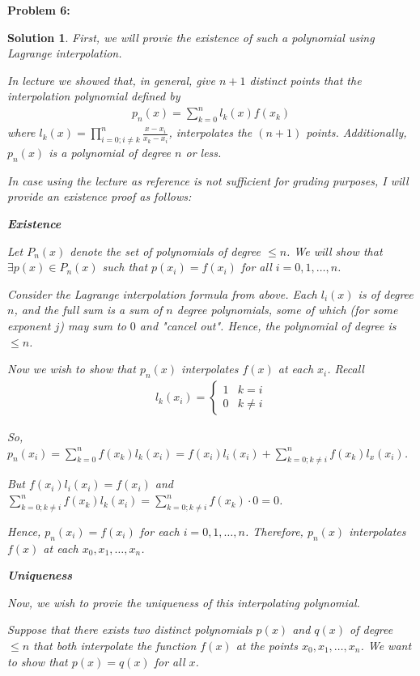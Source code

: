 \documentclass[12pt, letterpaper]{article}
\theoremstyle{nonumberplain}
\newtheorem{sol}{Solution}
\begin{document}
\hspace{18pt}\textbf{Problem 6:} \medskip
\begin{sol}
	First, we will provie the existence of such a polynomial using Lagrange interpolation.

	In lecture we showed that, in general, give $n+1$ distinct points that the interpolation polynomial defined by
	\begin{gather*}
		p_n(x) = \sum_{k=0}^n l_k(x) f(x_k)
	\end{gather*}
	where $l_k(x) = \prod_{i=0; i\neq k}^n \frac{x - x_i}{x_k - x_i}$, interpolates the $(n+1)$ points. Additionally, $p_n(x)$ is a polynomial of degree $n$ or less.

	In case using the lecture as reference is not sufficient for grading purposes, I will provide an existence proof as follows:

	\textbf{Existence}

	Let $P_n(x)$ denote the set of polynomials of degree $\leq n$. We will show that $\exists p(x) \in P_n(x)$ such that $p(x_i) = f(x_i)$ for all $i = 0, 1, \ldots, n$.

	Consider the Lagrange interpolation formula from above. Each $l_i(x)$ is of degree $n$, and the full sum is a sum of $n$ degree polynomials, some of which (for some exponent $j$) may sum to $0$ and "cancel out". Hence, the polynomial of degree is $\leq n$.

	Now we wish to show that $p_n(x)$ interpolates $f(x)$ at each $x_i$. Recall
	\begin{gather*}
		l_k(x_i) =
		\begin{cases}
			1 & k = i    \\
			0 & k \neq i
		\end{cases}
	\end{gather*}

	So, $p_n(x_i) = \sum_{k=0}^n f(x_k)l_k(x_i) = f(x_i)l_i(x_i) + \sum_{k=0;k\neq i}^n f(x_k)l_x(x_i)$.

	But $f(x_i)l_i(x_i) = f(x_i)$ and $\sum_{k=0;k\neq i}^n f(x_k)l_k(x_i) = \sum_{k=0;k\neq i}^n f(x_k)\cdot 0 = 0$.

	Hence, $p_n(x_i) = f(x_i)$ for each $i = 0, 1, \ldots, n$. Therefore, $p_n(x)$ interpolates $f(x)$ at each $x_0, x_1, \ldots, x_n$.

	\medskip

	\textbf{Uniqueness}

	Now, we wish to provie the uniqueness of this interpolating polynomial.

	Suppose that there exists two distinct polynomials $p(x)$ and $q(x)$ of degree $\leq n$ that both interpolate the function $f(x)$ at the points $x_0, x_1, \ldots, x_n$. We want to show that $p(x) = q(x)$ for all $x$.


\end{sol}
\end{document}
